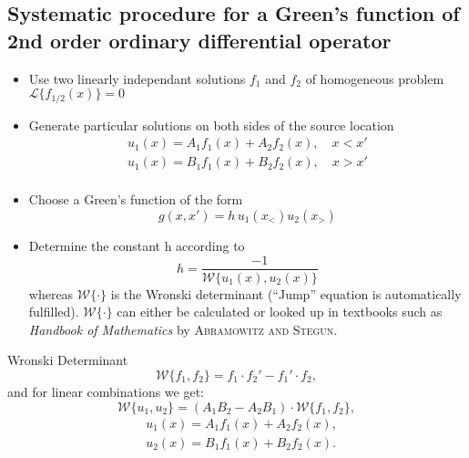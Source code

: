 \subsection{Systematic procedure for a Green's function of 2nd order ordinary differential operator}
\begin{itemize}
  \item Use two linearly independant solutions $f_1$ and $f_2$ of homogeneous problem \(\mathcal{L}\{f_{1/2}(x)\} = 0\)
  \item Generate particular solutions on both sides of the source location
        \begin{align*}
          u_{1}(x) = A_{1} f_{1}(x) + A_{2} f_{2}(x), \quad x < x'\\
          u_{1}(x) = B_{1} f_{1}(x) + B_{2} f_{2}(x), \quad x > x'\\
        \end{align*}
  \item Choose a Green's function of the form
        \begin{equation*}
          g(x, x') = h \, u_{1}(x_{<})u_{2}(x_{>})
        \end{equation*}
  \item Determine the constant h according to
        \begin{equation*}
          h = \dfrac{-1}{\mathcal{W}\{u_{1}(x), u_{2}(x)\}}
        \end{equation*}
        whereas $\mathcal{W}\{\cdot\}$ is the Wronski determinant (``Jump'' equation is automatically fulfilled). $\mathcal{W}\{\cdot\}$ can either be calculated or looked up in textbooks such as \textit{Handbook of Mathematics} by \textsc{Abramowitz and Stegun}.
\end{itemize}

\begin{definition}{Wronski Determinant}
  \begin{equation*}
    \mathcal{W}\{f_{1}, f_{2}\} = f_{1}\cdot f_{2}' - f_{1}'\cdot f_{2},
  \end{equation*}
  and for linear combinations we get:
  \begin{equation*}
    \mathcal{W}\{u_{1}, u_{2}\} = (A_{1}B_{2} - A_{2}B_{1}) \cdot \mathcal{W}\{f_{1}, f_{2}\},
  \end{equation*}
  \begin{align*}
    &u_{1}(x) = A_{1}f_{1}(x) + A_{2}f_{2}(x),\\
    &u_{2}(x) = B_{1}f_{1}(x) + B_{2}f_{2}(x).
  \end{align*}
\end{definition}

